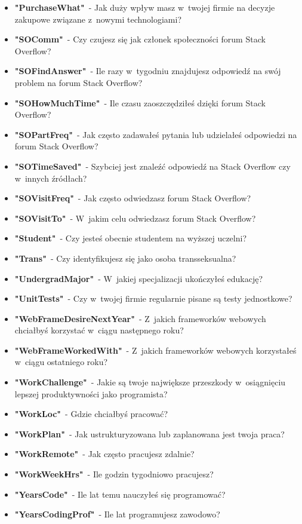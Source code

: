 \begin{appendices}
\begin{itemize}
        \item \textbf{"PurchaseWhat"}~- Jak duży wpływ masz w~twojej firmie na decyzje zakupowe związane z~nowymi technologiami?
        \item \textbf{"SOComm"}~- Czy czujesz się jak członek społeczności forum Stack Overflow?
        \item \textbf{"SOFindAnswer"}~- Ile razy w~tygodniu znajdujesz odpowiedź na swój problem na forum Stack Overflow?
        \item \textbf{"SOHowMuchTime"}~- Ile czasu zaoszczędziłeś dzięki forum Stack Overflow?
        \item \textbf{"SOPartFreq"}~- Jak często zadawałeś pytania lub udzielałeś odpowiedzi na forum Stack Overflow?
        \item \textbf{"SOTimeSaved"}~- Szybciej jest znaleźć odpowiedź na Stack Overflow czy w~innych źródłach?
        \item \textbf{"SOVisitFreq"}~- Jak często odwiedzasz forum Stack Overflow?
        \item \textbf{"SOVisitTo"}~- W~jakim celu odwiedzasz forum Stack Overflow?
        \item \textbf{"Student"}~- Czy jesteś obecnie studentem na wyższej uczelni?
        \item \textbf{"Trans"}~- Czy identyfikujesz się jako osoba transseksualna?
        \item \textbf{"UndergradMajor"}~- W~jakiej specjalizacji ukończyłeś edukację?
        \item \textbf{"UnitTests"}~- Czy w~twojej firmie regularnie pisane są testy jednostkowe?
        \item \textbf{"WebFrameDesireNextYear"}~- Z~jakich frameworków webowych chciałbyś korzystać w~ciągu następnego roku?
        \item \textbf{"WebFrameWorkedWith"}~- Z~jakich frameworków webowych korzystałeś w~ciągu ostatniego roku?
        \item \textbf{"WorkChallenge"}~- Jakie są twoje największe przeszkody w~osiągnięciu lepszej produktywności jako programista?
        \item \textbf{"WorkLoc"}~- Gdzie chciałbyś pracować?
        \item \textbf{"WorkPlan"}~- Jak ustrukturyzowana lub zaplanowana jest twoja praca?
        \item \textbf{"WorkRemote"}~- Jak często pracujesz zdalnie?
        \item \textbf{"WorkWeekHrs"}~- Ile godzin tygodniowo pracujesz?
        \item \textbf{"YearsCode"}~- Ile lat temu nauczyłeś się programować?
        \item \textbf{"YearsCodingProf"}~- Ile lat programujesz zawodowo?
    \end{itemize}
\end{appendices}
\thispagestyle{normal}

